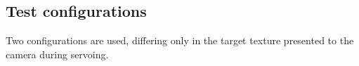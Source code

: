 %
%
%
%
%

\subsection{Test configurations}
\label{sec:test-configurations}

Two configurations are used, differing only in the target texture presented
to the camera during servoing.

